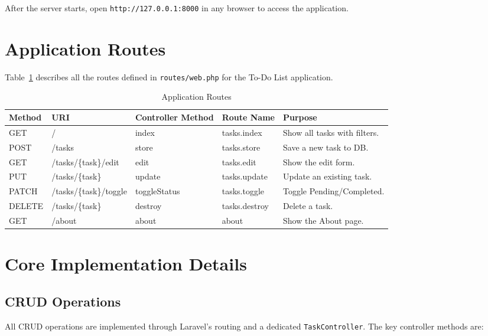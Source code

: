 \documentclass[12pt,a4paper]{report}
\begin{document}
After the server starts, open \texttt{http://127.0.0.1:8000} in any browser to
access the application.

\section{Application Routes}

Table~\ref{tab:routes} describes all the routes defined in \texttt{routes/web.php}
for the To-Do List application.

\begin{table}[h!]
\centering
\caption{Application Routes}
\label{tab:routes}
\renewcommand{\arraystretch}{1.3}
\begin{tabularx}{\textwidth}{@{}llllX@{}}
\toprule
\textbf{Method} & \textbf{URI} & \textbf{Controller Method} & \textbf{Route Name} & \textbf{Purpose} \\
\midrule
GET    & /                      & index        & tasks.index   & Show all tasks with filters. \\
POST   & /tasks                 & store        & tasks.store   & Save a new task to DB. \\
GET    & /tasks/\{task\}/edit   & edit         & tasks.edit    & Show the edit form. \\
PUT    & /tasks/\{task\}        & update       & tasks.update  & Update an existing task. \\
PATCH  & /tasks/\{task\}/toggle & toggleStatus & tasks.toggle  & Toggle Pending/Completed. \\
DELETE & /tasks/\{task\}        & destroy      & tasks.destroy & Delete a task. \\
GET    & /about                 & about        & about         & Show the About page. \\
\bottomrule
\end{tabularx}
\end{table}

\section{Core Implementation Details}

\subsection{CRUD Operations}

All CRUD operations are implemented through Laravel's routing and a dedicated
\texttt{TaskController}. The key controller methods are:
\end{document}
